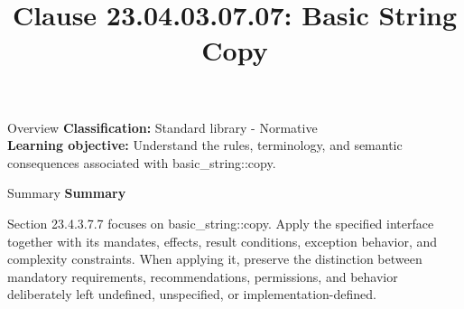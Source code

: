 \documentclass[10pt,letterpaper]{article}
\title{Clause 23.04.03.07.07: Basic String Copy}
\author{}
\date{}
\begin{document}
\maketitle
\begin{CornellOverviewBox}{Overview}
\textbf{Classification:} Standard library - Normative\\[2pt]
\textbf{Learning objective:} Understand the rules, terminology, and semantic consequences associated with basic\_string::copy.
\end{CornellOverviewBox}\begin{CornellSummaryBox}{Summary}
{\sffamily\bfseries\color{Accent} Summary}\par\vspace{3pt}Section 23.4.3.7.7 focuses on basic\_string::copy. Apply the specified interface together with its mandates, effects, result conditions, exception behavior, and complexity constraints. When applying it, preserve the distinction between mandatory requirements, recommendations, permissions, and behavior deliberately left undefined, unspecified, or implementation-defined.
\end{CornellSummaryBox}
\end{document}

